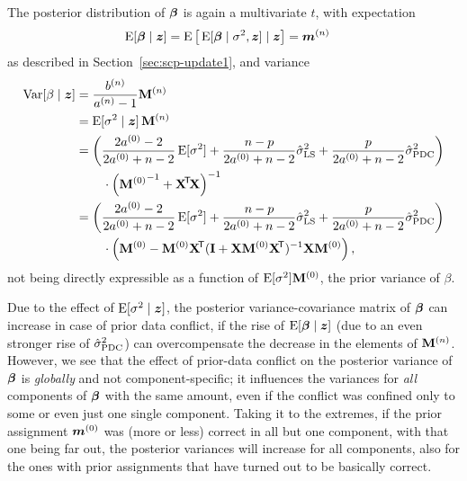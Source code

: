 The posterior distribution of $\boldsymbol{\beta}$ is again a multivariate $t$, with expectation
\begin{align*}
\operatorname{E}[\boldsymbol{\beta}\mid {\bm z}] &= \operatorname{E}\big[ \operatorname{E}[\boldsymbol{\beta}\mid\sigma^2, {\bm z}] \mid {\bm z} \big]= {\bm m}^{(n)}
\end{align*}
as described in Section~\ref{sec:scp-update1},
and variance %
\begin{align}
\V[\beta\mid \z]
                  &= \frac{\bn}{\an - 1} \Mn \nonumber\\
                  &= \E[\sigma^2\mid \z]\, \Mn  \label{equ:scp-varbeta}\\
                  &= \bigg( \frac{2\az - 2}{2\az + n - 2} \E[\sigma^2]
                           +\frac{n - p}   {2\az + n - 2} \sls
                           +\frac{p}       {2\az + n - 2} \spdc \bigg) \nonumber\\
                  & \hspace*{5ex}\cdot
                     \left( {\Mz}^{-1} + \XtX \right)^{-1} \nonumber\\
                  &= \bigg( \frac{2\az - 2}{2\az + n - 2} \E[\sigma^2]
                           +\frac{n - p}   {2\az + n - 2} \sls
                           +\frac{p}       {2\az + n - 2} \spdc \bigg) \nonumber\\
                  & \hspace*{5ex}\cdot
                     \Big( \Mz - \Mz \X^\tra (\mbf{I} + \X \Mz \X^\tra)^{-1} \X \Mz \Big) \,, \nonumber%
\end{align}
not being directly expressible as a function of $\operatorname{E}[\sigma^2] \mathbf{M}^{(0)}$,
the prior variance of $\beta$. %

Due to the effect of $\operatorname{E}[\sigma^2\mid {\bm z}]$, the posterior variance-covariance matrix
of $\boldsymbol{\beta}$ can increase in case of prior data conflict, if the rise of $\operatorname{E}[\boldsymbol{\beta}\mid {\bm z}]$
(due to an even stronger rise of $\hat{\sigma}^2_\text{PDC}$) can overcompensate the decrease in the elements of $\mathbf{M}^{(n)}$.
However, we see that the effect of prior-data conflict on the posterior variance of $\boldsymbol{\beta}$ %
is \emph{globally} and not component-specific; it influences the variances for \emph{all} components of $\boldsymbol{\beta}$
with the same amount, even if the conflict was confined only to some or even just one single component.
Taking it to the extremes, if the prior assignment ${\bm m}^{(0)}$ was (more or less) correct in all but one component,
with that one being far out, the posterior variances will increase for all components,
also for the ones with prior assignments that have turned out to be basically correct.


